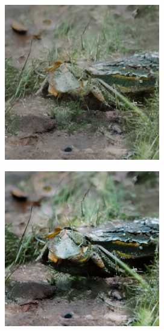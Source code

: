 \documentclass{article}
\begin{document}
\begin{figure}
    \begin{subfigure}[b]{0.19\linewidth}
    \includegraphics[width=\linewidth]{figures/imagenet256/solver_samples/imagenet256_fm_ot_05_05.png}
    \end{subfigure}
    \begin{subfigure}[b]{0.19\linewidth}
    \includegraphics[width=\linewidth]{figures/imagenet256/solver_samples/imagenet256_fm_ot_05_10.png}

\end{subfigure}
\end{figure}
\end{document}
